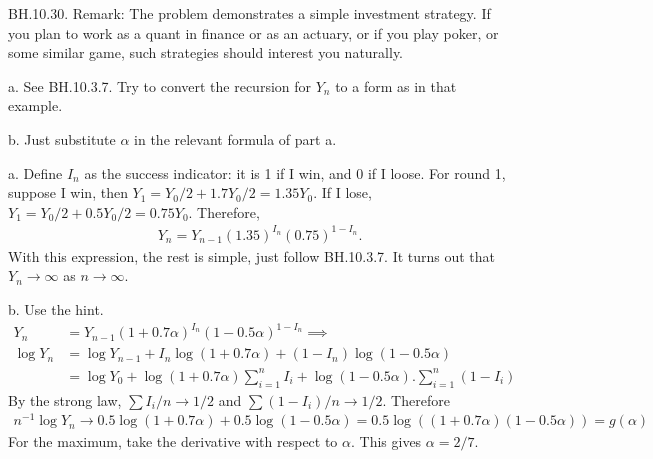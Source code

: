 
\setcounter{theorem}{29}
\begin{exercise} BH.10.30.
Remark:  The problem demonstrates a simple investment strategy.
If you plan to work as a quant in finance or as an actuary, or if you play poker, or some similar game, such strategies should interest you naturally.

\begin{hint}
a. See BH.10.3.7. Try to convert the recursion for $Y_n$ to a form as in that example.

b. Just substitute $\alpha$ in the relevant formula of part a.
\end{hint}
\begin{solution}
a. Define $I_n$ as the success indicator: it is 1 if I win, and 0 if I loose.  For round 1, suppose I win, then $Y_{1} = Y_0/2 + 1.7 Y_0/2= 1.35 Y_{0}$. If I lose,
$Y_{1} = Y_0/2 + 0.5 Y_0/2= 0.75 Y_{0}$. Therefore,
\begin{align*}
Y_n = Y_{n-1} (1.35)^{I_{n}}(0.75)^{1-I_{n}}.
\end{align*}
With this expression, the rest  is simple, just  follow  BH.10.3.7.
It turns out that $Y_n\to\infty$ as $n\to\infty$.

b. Use the hint.
\begin{align*}
Y_n &= Y_{n-1} (1+0.7\alpha)^{I_{n}}(1-0.5\alpha)^{1-I_{n}} \implies \\
\log Y_n &= \log Y_{n-1}  + I_{n} \log(1+0.7\alpha) + (1-I_{n})\log (1-0.5\alpha)  \\
& = \log Y_{0}  + \log(1+0.7\alpha) \sum_{i=1}^{n}I_{i}  + \log(1-0.5\alpha).\sum_{i=1}^{n} (1-I_{i})
\end{align*}
By the strong law, $\sum I_i/n \to 1/2$ and $\sum (1-I_{i})/n \to 1/2$. Therefore
\begin{align*}
n^{-1}\log Y_n \to 0.5 \log(1+0.7\alpha) + 0.5\log(1-0.5\alpha) = 0.5 \log( (1+0.7\alpha)(1-0.5\alpha)) = g(\alpha)
\end{align*}
For the maximum, take the derivative with respect to $\alpha$. This gives $\alpha=2/7$.
\end{solution}
\end{exercise}

